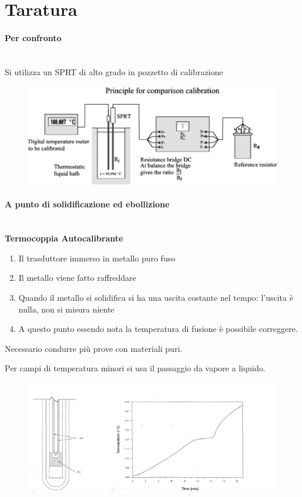 \documentclass[a4paper, 15pt]{article}
\begin{document}
\section{Taratura}
\begin{adjustwidth}{2in}{}
	\nointerlineskip\leavevmode
	\paragraph{Per confronto} \mbox{} \\
	Si utilizza un SPRT di alto grado in pozzetto di calibrazione
		\begin{figure}[H]
			\centering
			\includegraphics[width=0.5\linewidth]{immagini/screenshot041}
			\label{fig:screenshot041}
		\end{figure}
		
		\paragraph{A punto di solidificazione ed ebollizione} \mbox{} \\
		\textbf{Termocoppia Autocalibrante}\\
		\begin{enumerate}
		\item Il trasduttore immerso in metallo puro fuso
		\item Il metallo viene fatto raffreddare
		\item Quando il metallo si solidifica si ha una uscita costante nel tempo: l'uscita è nulla, non si misura niente
		\item A questo punto essendo nota la temperatura di fusione è possibile correggere.
		\end{enumerate}
		Necessario condurre più prove con materiali puri. 
		
		Per campi di temperatura minori si usa il passaggio da vapore a liquido.		
		\begin{figure}[H]
			\centering
			\includegraphics[width=0.5\linewidth]{immagini/screenshot042}
			\label{fig:screenshot042}
		\end{figure}
		

\end{adjustwidth}
\end{document}
